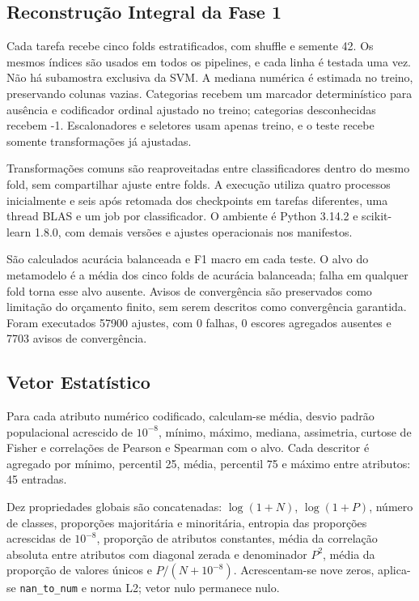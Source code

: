 \documentclass[kdmile,a4paper]{kdmile} %
\begin{document}
\subsection{Reconstrução Integral da Fase 1}

Cada tarefa recebe cinco folds estratificados, com shuffle e semente 42. Os mesmos índices são usados em todos os pipelines, e cada linha é testada uma vez. Não há subamostra exclusiva da SVM. A mediana numérica é estimada no treino, preservando colunas vazias. Categorias recebem um marcador determinístico para ausência e codificador ordinal ajustado no treino; categorias desconhecidas recebem -1. Escalonadores e seletores usam apenas treino, e o teste recebe somente transformações já ajustadas.

Transformações comuns são reaproveitadas entre classificadores dentro do mesmo fold, sem compartilhar ajuste entre folds. A execução utiliza quatro processos inicialmente e seis após retomada dos checkpoints em tarefas diferentes, uma thread BLAS e um job por classificador. O ambiente é Python 3.14.2 e scikit-learn 1.8.0, com demais versões e ajustes operacionais nos manifestos.

São calculados acurácia balanceada e F1 macro em cada teste. O alvo do metamodelo é a média dos cinco folds de acurácia balanceada; falha em qualquer fold torna esse alvo ausente. Avisos de convergência são preservados como limitação do orçamento finito, sem serem descritos como convergência garantida. Foram executados 57900 ajustes, com 0 falhas, 0 escores agregados ausentes e 7703 avisos de convergência.

\subsection{Vetor Estatístico}

Para cada atributo numérico codificado, calculam-se média, desvio padrão populacional acrescido de $10^{-8}$, mínimo, máximo, mediana, assimetria, curtose de Fisher e correlações de Pearson e Spearman com o alvo. Cada descritor é agregado por mínimo, percentil 25, média, percentil 75 e máximo entre atributos: 45 entradas.

Dez propriedades globais são concatenadas: $\log(1+N)$, $\log(1+P)$, número de classes, proporções majoritária e minoritária, entropia das proporções acrescidas de $10^{-8}$, proporção de atributos constantes, média da correlação absoluta entre atributos com diagonal zerada e denominador $P^2$, média da proporção de valores únicos e $P/(N+10^{-8})$. Acrescentam-se nove zeros, aplica-se \texttt{nan\_to\_num} e norma L2; vetor nulo permanece nulo.
\end{document}
